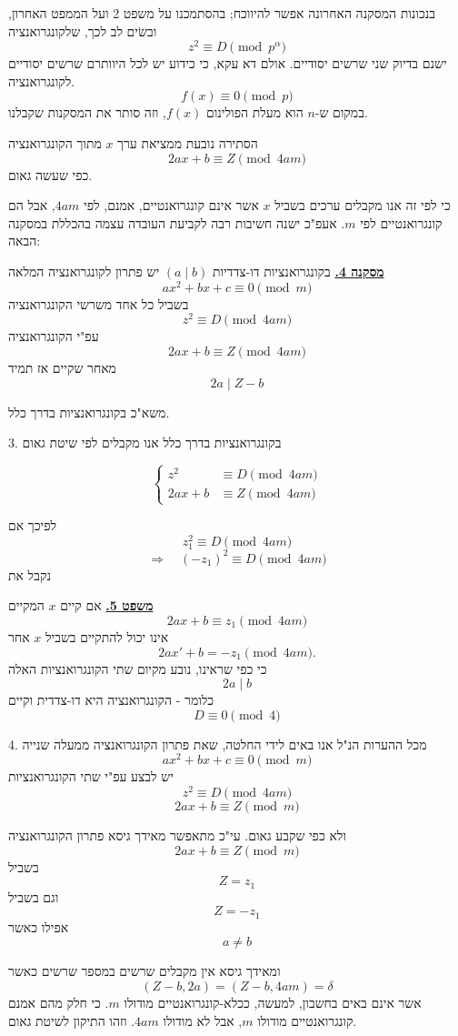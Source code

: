 בנכונות המסקנה האחרונה אפשר להיווכח; בהסתמכנו על משפט 2 ועל
הממפט האחרון, ובשׂים לב לכך, שלקונגרואנציה
\[ z^2 \equiv D \pmod{p^{\alpha}} \]
ישנם בדיוק שני שרשים יסודיים. אולם דא עקא, כי כידוע יש לכל
היוותרם שרשים יסודיים לקונגרואנציה.
\[ f(x) \equiv 0 \pmod{p} \]
במקום ש-$n$ הוא מעלת הפולינום $f(x)$, וזה סותר את המסקנות שקבלנו.

הסתירה נובעת ממציאת ערך $x$ מתוך הקונגרואנציה
\[ 2ax + b \equiv Z \pmod{4am} \]
כפי שעשה גאום.

כי לפי זה אנו מקבלים ערכים בשביל $x$ אשר אינם קונגרואנטיים,
אמנם, לפי $4am$, אבל הם קונגרואנטיים לפי $m$.
אעפ"כ ישנה חשיבות רבה לקביעת העובדה עצמה בהכללת במסקנה הבאה:

\bigskip
\noindent\textbf{\underline{מסקנה 4.}}
בקונגרואנציות דו-צדדיות $(a \mid b)$ יש פתרון לקונגרואנציה המלאה
\[ ax^2 + bx + c \equiv 0 \pmod{m} \]
בשביל כל אחד משרשי הקונגרואנציה
\[ z^2 \equiv D \pmod{4am} \]
עפ"י הקונגרואנציה
\[ 2ax + b \equiv Z \pmod{4am} \]
מאחר שקיים אז תמיד
\[ 2a \mid Z - b \]

משא"כ בקונגרואנציות בדרך כלל.

3. בקונגרואנציות בדרך כלל אנו מקבלים לפי שיטת גאום

\[
\left\{
\begin{aligned}
z^2 &\equiv D \pmod{4am} \\
2ax + b &\equiv Z \pmod{4am}
\end{aligned}
\right.
\]

לפיכך אם
\[ z_1^2 \equiv D \pmod{4am} \]
\[ \Rightarrow \quad (-z_1)^2 \equiv D \pmod{4am} \]
נקבל את

\bigskip
\noindent\textbf{\underline{משפט 5.}}
אם קיים $x$ המקיים
\[ 2ax + b \equiv z_1 \pmod{4am} \]
אינו יכול להתקיים בשביל $x$ אחר
\[ 2ax' + b = -z_1 \pmod{4am} . \]
כי כפי שראינו, נובע מקיום שתי הקונגרואנציות האלה
\[ 2a \mid b \]
כלומר - הקונגרואנציה היא דו-צדדית וקיים
\[ D \equiv 0 \pmod{4} \]

4. מכל ההערות הנ"ל אנו באים לידי החלטה, שאת פתרון הקונגרואנציה ממעלה שנייה
\[ ax^2 + bx + c \equiv 0 \pmod{m} \]
יש לבצע עפ"י שתי הקונגרואנציות
\[ z^2 \equiv D \pmod{4am} \]
\[ 2ax + b \equiv Z \pmod{m} \]

ולא כפי שקבע גאום.
עי"כ מתאפשר מאידך גיסא פתרון הקונגרואנציה
\[ 2ax + b \equiv Z \pmod{m} \]
בשביל
\[ Z = z_1 \]
וגם בשביל
\[ Z = -z_1 \]
אפילו כאשר
\[ a \neq b \]

ומאידך גיסא אין מקבלים שרשים במספר שרשים כאשר
\[ (Z - b, 2a) = (Z - b, 4am) = \delta \]
אשר אינם באים בחשבון, למעשה, ככלא-קונגרואנטיים מודולו $m$.
כי חלק מהם אמנם קונגרואנטיים מודולו $m$, אבל לא מודולו $4am$.
וזהו התיקון לשיטת גאום.

